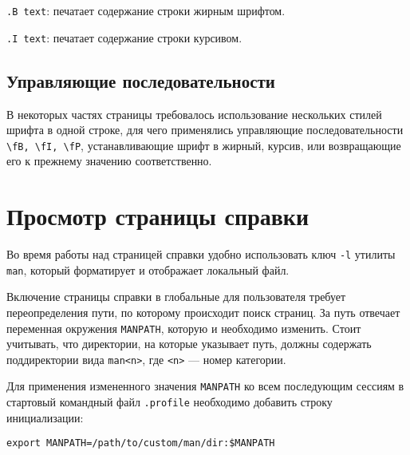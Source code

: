 \documentclass[listings]{labreport}
\begin{document}
\texttt{.B text}: печатает содержание строки жирным шрифтом.

\texttt{.I text}: печатает содержание строки курсивом.

\subsection*{Управляющие последовательности}

В некоторых частях страницы требовалось использование нескольких стилей шрифта в одной строке, для чего применялись
управляющие последовательности \texttt{\textbackslash fB, \textbackslash fI, \textbackslash fP},
устанавливающие шрифт в жирный, курсив, или возвращающие его к прежнему значению соответственно.

\section*{Просмотр страницы справки}

Во время работы над страницей справки удобно использовать ключ \texttt{-l} утилиты \texttt{man},
который форматирует и отображает локальный файл.

Включение страницы справки в глобальные для пользователя требует переопределения
пути, по которому происходит поиск страниц. За путь отвечает переменная окружения \texttt{MANPATH},
которую и необходимо изменить. Стоит учитывать, что директории, на которые указывает путь,
должны содержать поддиректории вида \texttt{man<n>}, где \texttt{<n>} — номер категории.

Для применения измененного значения \texttt{MANPATH} ко всем последующим сессиям
в стартовый командный файл \texttt{.profile} необходимо добавить строку инициализации:

\begin{verbatim}
export MANPATH=/path/to/custom/man/dir:$MANPATH
\end{verbatim}
\end{document}
